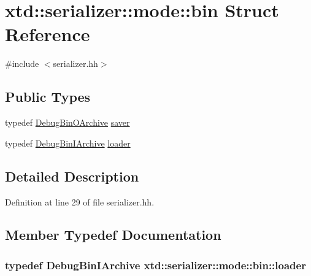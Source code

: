 \hypertarget{structxtd_1_1serializer_1_1mode_1_1bin}{}\section{xtd\+:\+:serializer\+:\+:mode\+:\+:bin Struct Reference}
\label{structxtd_1_1serializer_1_1mode_1_1bin}


{\ttfamily \#include $<$serializer.\+hh$>$}

\subsection*{Public Types}
\begin{DoxyCompactItemize}
\item 
typedef \hyperlink{classxtd_1_1serializer_1_1DebugBinOArchive}{Debug\+Bin\+O\+Archive} \hyperlink{structxtd_1_1serializer_1_1mode_1_1bin_a796ef43a002a185030eed66012cf57fb}{saver}
\item 
typedef \hyperlink{classxtd_1_1serializer_1_1DebugBinIArchive}{Debug\+Bin\+I\+Archive} \hyperlink{structxtd_1_1serializer_1_1mode_1_1bin_a123c17c4e327f82c8c188630e623ba91}{loader}
\end{DoxyCompactItemize}


\subsection{Detailed Description}


Definition at line 29 of file serializer.\+hh.



\subsection{Member Typedef Documentation}
\subsubsection[{\texorpdfstring{loader}{loader}}]{\setlength{\rightskip}{0pt plus 5cm}typedef {\bf Debug\+Bin\+I\+Archive} {\bf xtd\+::serializer\+::mode\+::bin\+::loader}}\hypertarget{structxtd_1_1serializer_1_1mode_1_1bin_a123c17c4e327f82c8c188630e623ba91}{}\label{structxtd_1_1serializer_1_1mode_1_1bin_a123c17c4e327f82c8c188630e623ba91}


